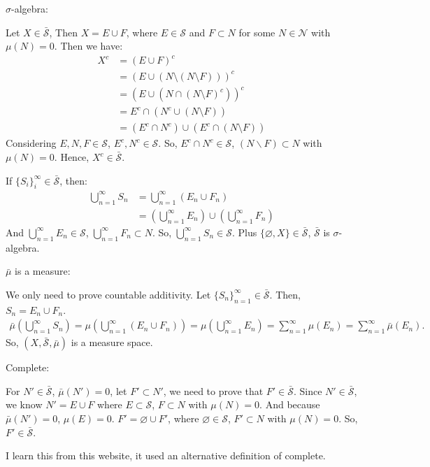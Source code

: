 \documentclass[12pt]{article}
\newenvironment{solution}{\begin{tcolorbox}[colback=white, colframe=black!50, breakable, title=Solution. ]\setlength{\parskip}{0.8em}}{\end{tcolorbox}}
\begin{document}
    \begin{solution}
        $\sigma$-algebra: 

        Let $X\in \bar{\mathscr{S}}$, Then $X=E\cup F$, where $E\in \mathscr{S}$ and $F\subset N$ for some $N\in\mathscr{N}$ with $\mu(N)=0$. Then we have: 
        \begin{align*} 
            X^c &= (E \cup F)^c \\ 
            &= (E \cup (N \setminus (N \setminus F)))^c \\ 
            &= (E \cup (N \cap (N \setminus F)^c))^c \\ 
            &= E^c \cap (N^c \cup (N \setminus F)) \\ 
            &= (E^c \cap N^c) \cup (E^c \cap (N \setminus F)) 
        \end{align*}
        Considering $E, N, F\in\mathscr{S}$, $E^c, N^c\in\mathscr{S}$. So, $E^c\cap N^c\in\mathscr{S}$, $(N\backslash F)\subset N$ with $\mu(N)=0$. Hence, $X^c\in \bar{\mathscr{S}}$. 

        If $\{S_i\}_i^\infty\in\bar{\mathscr{S}}$, then:
        \begin{align*} 
            \bigcup_{n=1}^{\infty} S_n &= \bigcup_{n=1}^{\infty} (E_n \cup F_n) \\ 
            &= \left ( \bigcup_{n=1}^{\infty} E_n \right ) \cup \left ( \bigcup_{n=1}^{\infty} F_n \right ) 
        \end{align*}
        And $\bigcup_{n=1}^{\infty} E_n\in\mathscr{S}$, $\bigcup_{n=1}^{\infty} F_n\subset N$. So, $ \bigcup_{n=1}^{\infty} S_n\in \mathscr{S}$. Plus $\{\varnothing, X\}\in\bar{\mathscr{S}}$, $\bar{\mathscr{S}}$ is $\sigma$-algebra. 

        $\bar{\mu}$ is a measure: 

        We only need to prove countable additivity. Let $\{S_n\}_{n=1}^\infty\in\bar{\mathscr{S}}$. Then, $S_n=E_n\cup F_n$. 
        \begin{align*} 
            \bar{\mu} \left ( \bigcup_{n=1}^{\infty} S_n \right ) = \mu \left ( \bigcup_{n=1}^{\infty} (E_n\cup F_n) \right ) = \mu \left ( \bigcup_{n=1}^{\infty} E_n \right ) =\sum_{n=1}^{\infty} \mu (E_n) = \sum_{n=1}^{\infty} \bar{\mu} (E_n). 
        \end{align*}
        So, $(X, \bar{\mathscr{S}}, \bar{\mu})$ is a measure space. 

        Complete: 

        For $N'\in\bar{\mathscr{S}}$, $\bar{\mu}(N')=0$, let $F'\subset N'$, we need to prove that $F'\in \bar{\mathscr{S}}$. Since $N'\in \bar{\mathscr{S}}$, we know $N'=E\cup F$ where $E\subset{\mathscr{S}}$, 
        $F\subset N$ with $\mu(N)=0$. And because $\bar{\mu}(N')=0$, $\mu(E)=0$. $F'=\varnothing\cup F'$, where $\varnothing\in\mathscr{S}$, $F'\subset N$ with $\mu(N)=0$. So, $F'\in\bar{\mathscr{S}}$. 
        
        I learn this from this website, it used an alternative definition of complete. 
        
    \end{solution}
\end{document}
